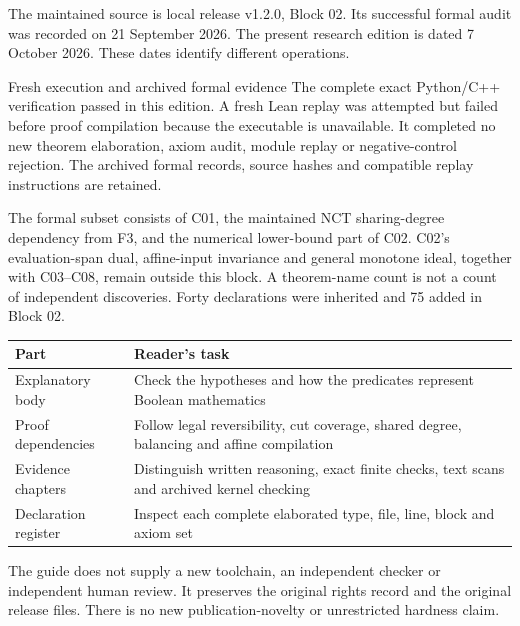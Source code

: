 The maintained source is local release v1.2.0, Block 02. Its successful formal
audit was recorded on 21 September 2026. The present research edition is dated
7 October 2026. These dates identify different operations.
\begin{statusbox}{Fresh execution and archived formal evidence}
The complete exact Python/C++ verification passed in this edition. A fresh
Lean replay was attempted but failed before proof compilation because the
 executable is unavailable. It completed no new theorem elaboration,
axiom audit, module replay or negative-control rejection. The archived formal
records, source hashes and compatible replay instructions are retained.
\end{statusbox}

The formal subset consists of C01, the maintained NCT sharing-degree dependency
from F3, and the numerical lower-bound part of C02. C02's evaluation-span dual,
affine-input invariance and general monotone ideal, together with C03--C08,
remain outside this block. A theorem-name count is not a count of independent
discoveries. Forty declarations were inherited and 75 added in Block 02.

\begin{tabularx}{\textwidth}{@{}>{\raggedright\arraybackslash}p{1.35in}>{\raggedright\arraybackslash}X@{}}\toprule
Part & Reader's task\\\midrule
Explanatory body & Check the hypotheses and how the predicates represent Boolean mathematics\\
Proof dependencies & Follow legal reversibility, cut coverage, shared degree, balancing and affine compilation\\
Evidence chapters & Distinguish written reasoning, exact finite checks, text scans and archived kernel checking\\
Declaration register & Inspect each complete elaborated type, file, line, block and axiom set\\\bottomrule
\end{tabularx}

The guide does not supply a new toolchain, an independent checker or independent
human review. It preserves the original rights record and the original release
files. There is no new publication-novelty or unrestricted hardness claim.
\clearpage
